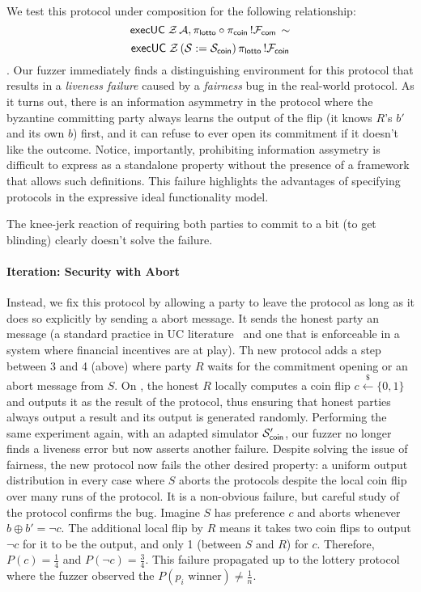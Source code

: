 We test this protocol under composition for the following relationship:
$${\mathsf {execUC}} \; \mathcal{Z} \, \mathcal{A}, \pi_{{\mathsf {lotto}}} \circ \pi_{{\mathsf {coin}}} \, !\mathcal{F}_{{\mathsf {com}}} \, \sim$$ 
$${\mathsf {execUC}} \; \mathcal{Z} \, (\mathcal{S} := \mathcal{S}_{{\mathsf {coin}}}) \, \pi_{{\mathsf {lotto}}} \, !\mathcal{F}_{{\mathsf {coin}}}$$.
Our fuzzer immediately finds a distinguishing environment for this protocol
that results in a \emph{liveness failure} caused by a \emph{fairness} bug in
the real-world protocol. As it turns out, there is an information asymmetry in
the protocol where the byzantine committing party always learns the output of
the flip (it knows $R$'s $b'$ and its own $b$) first, and it can refuse to ever
open its commitment if it doesn't like the outcome. Notice, importantly,
prohibiting information assymetry is difficult to express as a standalone
property without the presence of a framework that allows such definitions. This
failure highlights the advantages of specifying protocols in the expressive
ideal functionality model.

The knee-jerk reaction of requiring both parties to commit to a bit (to get
blinding) clearly doesn't solve the failure.

\paragraph{Iteration: Security with Abort}
Instead, we fix this protocol by allowing a party to leave the protocol as long
as it does so explicitly by sending a abort message.  It sends the honest party
an  message (a standard practice in UC literature~\cite{common, abort,
defs} and one that is enforceable in a system where financial incentives are at
play).  Th new protocol adds a step between 3 and 4 (above) where party $R$
waits for the commitment opening or an abort message from $S$.  On ,
the honest $R$ locally computes a coin flip $c \xleftarrow{\$} \{0,1\}$ and
outputs it as the result of the protocol, thus ensuring that honest parties
always output a result and its output is generated randomly.  Performing the
same experiment again, with an adapted simulator $\mathcal{S}'_{{\mathsf {coin}}}$, our fuzzer
no longer finds a liveness error but now asserts another failure.  Despite
solving the issue of fairness, the new protocol now fails the other desired
property: a uniform output distribution in every case where $S$ aborts the
protocols despite the local coin flip over many runs of the protocol.  It is a
non-obvious failure, but careful study of the protocol confirms the bug.
Imagine $S$ has preference $c$ and aborts whenever $b \oplus b' = \neg c$.  The
additional local flip by $R$ means it takes two coin flips to output $\neg c$
for it to be the output, and only 1 (between $S$ and $R$) for $c$.  Therefore,
$P(c) = \frac{1}{4}$ and $P(\neg c) = \frac{3}{4}$.  This failure propagated up
to the lottery protocol where the fuzzer observed the $P(p_i \text{ winner})
\neq \frac{1}{n}$.

